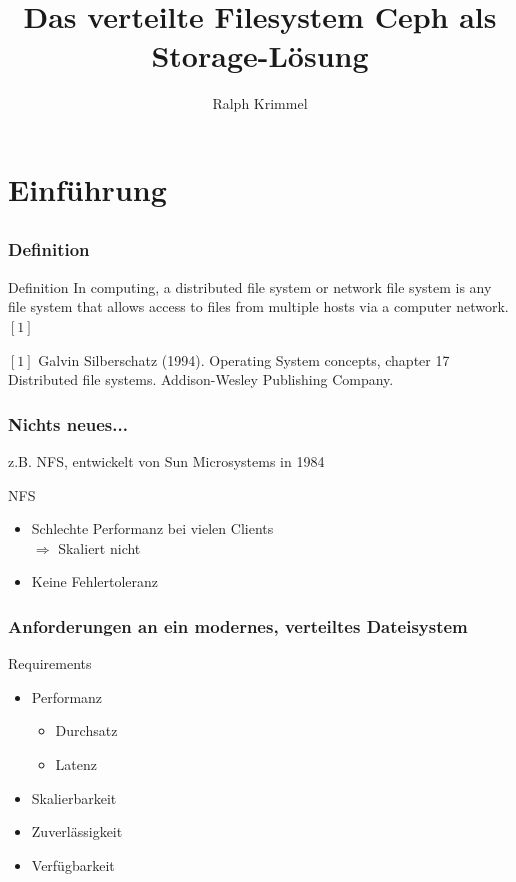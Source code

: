 \documentclass[notes=hide,yellow]{beamer}
\title{Das verteilte Filesystem Ceph als Storage-Lösung}
\subtitle{ }
\author{Ralph Krimmel}
\begin{document}
	\nocite{*} 
	\begin{frame}
		\titlepage
	\end{frame}

	\begin{frame}
		\tableofcontents
	\end{frame}


\section{Einf\"uhrung}
\subsection*{}

\begin{frame}
	\frametitle{Definition}
	\begin{block}{Definition}
		In computing, a distributed file system or network file system is any file system that allows access to files from multiple hosts via a computer network.$[1]$
	\end{block}
	\tiny{$[1]$ Galvin Silberschatz (1994). Operating System concepts, chapter 17 Distributed file systems. Addison-Wesley Publishing Company.} \\ 
\end{frame}

\begin{frame}
\frametitle{Nichts neues...}

		z.B. NFS, entwickelt von Sun Microsystems in 1984
		\begin{block}{NFS}
		\begin{itemize}
			\item Schlechte Performanz bei vielen Clients \\ $\Rightarrow$ Skaliert nicht
			\item Keine Fehlertoleranz
		\end{itemize}
	\end{block}
\end{frame}

\begin{frame}
	\frametitle{Anforderungen an ein modernes, verteiltes Dateisystem}
	\begin{block}{Requirements}
	\begin{itemize}
		\item Performanz
			\begin{itemize}
				\item Durchsatz
				\item Latenz
			\end{itemize}
		\item Skalierbarkeit
		\item Zuverl\"assigkeit
		\item Verf\"ugbarkeit
	\end{itemize}
	\end{block}
\end{frame}
\end{document}
